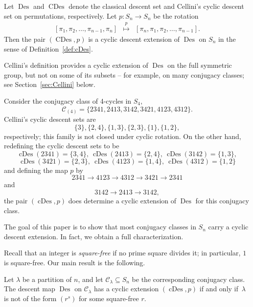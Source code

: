 \documentclass[ALCO,published]{cedram}
\newcommand{\C}{\mathcal C}
\DeclareMathOperator\Des{Des}
\DeclareMathOperator\cDes{cDes}
\DeclareMathOperator\CDes{CDes}
\begin{document}
\begin{observation}
    Let $\Des$ and $\CDes$ denote the classical descent set and Cellini's cyclic descent set on permutations, respectively.
    Let $p: S_n \rightarrow S_n$ be the rotation 
    \[
        \begin{array}{rcl}
            [\pi_1,\pi_2,\ldots,\pi_{n-1},\pi_n]&\overset{p}{\longmapsto}&
            [\pi_n,\pi_1,\pi_2,\ldots,\pi_{n-1}]. 
        \end{array}
    \]
    Then the pair $(\CDes,p)$ is a cyclic descent extension of $\Des$ on $S_n$ in the sense of Definition~\ref{def:cDes}.
\end{observation}
	
Cellini's definition provides a cyclic extension of $\Des$ on the full symmetric group, but not on some of its subsets -- for example, on many conjugacy classes;
see Section~\ref{sec:Cellini} below.

\begin{example}
    Consider the conjugacy class of 4-cycles in $S_4$,
    \[
        \C_{(4)}=\{2341, 2413, 3142, 3421, 4123, 4312\}.
    \]
    Cellini's cyclic descent sets are
    \[
        \{3\}, \{2,4\}, \{1,3\}, \{2,3\}, \{1\}, \{1,2\},
    \]
    respectively; this family is not closed under cyclic rotation.
    On the other hand, redefining the cyclic descent sets to be
    \[
        \cDes(2341)=\{3,4\},\ \cDes(2413)=\{2,4\}, \ \cDes(3142)=\{1,3\}, 
    \]
    \[
        \cDes(3421)=\{2,3\},\ \cDes(4123)=\{1,4\},\ \cDes(4312)=\{1,2\}
    \]
    and defining the map $p$ by
    \[
        2341 \rightarrow 4123 \rightarrow 4312 \rightarrow 3421 \rightarrow 2341
    \]
    and
    \[
        3142 \rightarrow 2413 \rightarrow 3142,
    \]
    the pair $(\cDes,p)$ does determine a cyclic extension of $\Des$ for this conjugacy class.
\end{example}
	
The goal of this paper is to show that most conjugacy classes in $S_n$ carry a cyclic descent extension.
In fact, we obtain a full characterization.

Recall that an integer is \emph{square-free} if no prime square divides it; in particular, $1$ is square-free. Our main result is the following. 
	
\begin{theorem}\label{thm:main}
    Let $\lambda$ be a partition of $n$, and let
    $\C_\lambda \subseteq S_n$ be the corresponding conjugacy class. 
    The descent map $\Des$ on $\C_\lambda$ has a cyclic extension $(\cDes,p)$ if and only if~$\lambda$ is not of the form $(r^s)$ for some square-free $r$.
\end{theorem}
	
\end{document}
